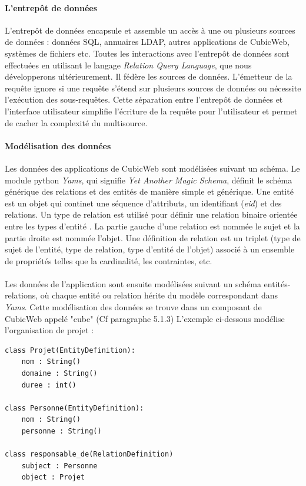 \documentclass {report}
\begin{document}
\paragraph{L'entrepôt de données}
L'entrepôt de données encapsule et assemble un accès à une ou plusieurs sources de données : données SQL, annuaires LDAP, autres applications de CubicWeb, systèmes de fichiers etc. Toutes les interactions avec l'entrepôt de données sont effectuées en utilisant le langage \textit{Relation Query Language}, que nous développerons ultérieurement. Il fédère les sources de données. L'émetteur de la requête ignore si une requête s'étend sur plusieurs sources de données ou nécessite l'exécution des sous-requêtes. Cette séparation entre l'entrepôt de données et l'interface utilisateur simplifie l'écriture de la requête pour l'utilisateur et permet de cacher la complexité du multisource.

\paragraph{Modélisation des données}
Les données des applications de CubicWeb sont modélisées suivant un schéma. Le module python \textit{Yams}, qui signifie \textit{Yet Another Magic Schema}, définit le schéma générique des relations et des entités de manière simple et générique. Une entité est un objet qui continet une séquence d'attributs, un identifiant (\textit{eid}) et des relations. Un type de relation est utilisé pour définir une relation binaire orientée entre les types d'entité . La partie gauche d'une relation est nommée le sujet et la partie droite est nommée l'objet. Une définition de relation est un triplet (type de sujet de l'entité, type de relation, type d'entité de l'objet) associé à un ensemble de propriétés telles que la cardinalité, les contraintes, etc.

\paragraph{}
Les données de l'application sont ensuite modélisées suivant un schéma entités-relations, où chaque entité ou relation hérite du modèle correspondant dans \textit{Yams}. Cette modélisation des données se trouve dans un composant de CubicWeb appelé "cube" (Cf paragraphe 5.1.3) L'exemple ci-dessous modélise l'organisation de projet :

\renewcommand{\lstlistingname}{Exemple}
\begin{lstlisting}[caption= Schéma de l'organisation d'un projet]
class Projet(EntityDefinition):
	nom : String()
	domaine : String()
	duree : int()

class Personne(EntityDefinition):
	nom : String()
	personne : String()
	
class responsable_de(RelationDefinition)
	subject : Personne
	object : Projet
\end{lstlisting}
\end{document}
